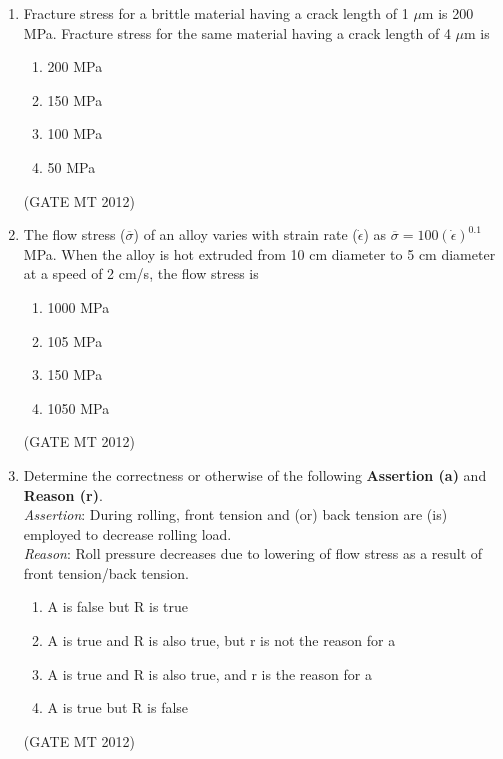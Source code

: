 \documentclass[journal, 11pt, onecolumn]{IEEEtran}
\theoremstyle{remark}
\begin{document}
\begin{enumerate}
\begin{multicols}{2}
\begin{enumerate}  
\item P-2, Q-3, R-4, S-1
\item P-2, Q-4, R-3, S-1
\item P-1, Q-2, R-4, S-3
\item P-1, Q-2, R-4, S-3
\end{enumerate}
\end{multicols}
\hfill(GATE MT 2012)

\item Fracture stress for a brittle material having a crack length of 1 $\mu$m is 200 MPa. Fracture stress for the same material having a crack length of 4 $\mu$m is
\begin{multicols}{2}
\begin{enumerate}  
\item 200 MPa
\item 150 MPa
\item 100 MPa
\item 50 MPa
\end{enumerate}
\end{multicols}
\hfill(GATE MT 2012)

\item The flow stress ($\overline{\sigma}$) of an alloy varies with strain rate ($\dot{\epsilon}$) as $\overline{\sigma} = 100(\dot{\epsilon})^{0.1}$ MPa. When the alloy is hot extruded from 10 cm diameter to 5 cm diameter at a speed of 2 cm/s, the flow stress is
\begin{multicols}{2}
\begin{enumerate}  
\item 1000 MPa
\item 105 MPa
\item 150 MPa
\item 1050 MPa
\end{enumerate}
\end{multicols}
\hfill(GATE MT 2012)

\item Determine the correctness or otherwise of the following \textbf{Assertion (a)} and \textbf{Reason (r)}.
\\[0.5em]\textit{Assertion}: During rolling, front tension and (or) back tension are (is) employed to decrease rolling load.\\
\textit{Reason}: Roll pressure decreases due to lowering of flow stress as a result of front tension/back tension.
\begin{enumerate}  
\item A is false but R is true
\item A is true and R is also true, but r is not the reason for a
\item A is true and R is also true, and r is the reason for a
\item A is true but R is false
\end{enumerate}
\hfill(GATE MT 2012)



\end{enumerate}
\end{document}

